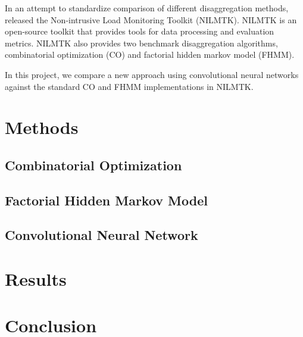 \documentclass[11pt]{article}
\begin{document}
In an attempt to standardize comparison of different disaggregation methods, \citet{Batra} released the Non-intrusive Load Monitoring Toolkit (NILMTK). NILMTK is an open-source toolkit that provides tools for data processing and evaluation metrics. NILMTK also provides two benchmark disaggregation algorithms, combinatorial optimization (CO) and factorial hidden markov model (FHMM). 

In this project, we compare a new approach using convolutional neural networks against the standard CO and FHMM implementations in NILMTK. 

\section{Methods}
\subsection{Combinatorial Optimization}
\subsection{Factorial Hidden Markov Model}

\subsection{Convolutional Neural Network}

\section{Results}

\section{Conclusion}





\end{document}
